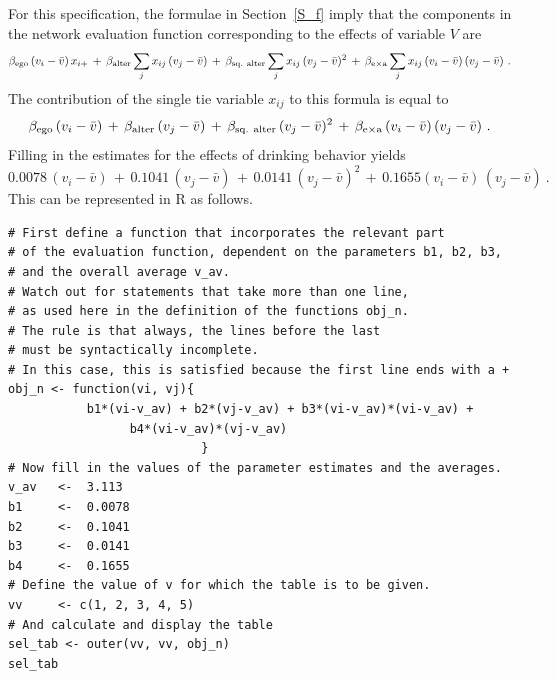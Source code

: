 \documentclass[a4paper,fleqn,11pt]{article}
\newcommand{\+}{\, + \,}
\newcommand{\R}{{\sf R }}
\begin{document}
For this specification, the formulae in Section~\ref{S_f} imply that the
components in the network evaluation function corresponding to the effects
of variable $V$ are
\begin{equation}
 \beta_{\rm ego}\, (v_i - \bar v) \, x_{i+}
           \, + \, \beta_{\rm alter}  \sum_j x_{ij}\, (v_j - \bar v)
 \, + \, \beta_{\rm sq.\ alter}  \sum_j x_{ij}\, (v_j - \bar v)^2  \, + \,
   \beta_{\rm e \times a}  \sum_j x_{ij}\,(v_i - \bar v) \,(v_j - \bar v)  \ .
        \label{eq_contr2_V}
\end{equation}
The contribution of the single tie variable $x_{ij}$ to this formula
is equal to
\begin{equation}
  \beta_{\rm ego}\, (v_i - \bar v)
         \, + \, \beta_{\rm alter}\,  (v_j - \bar v) \, + \,
      \beta_{\rm sq.\ alter}  \, (v_j - \bar v)^2  \,+\,
        \beta_{\rm e \times a} \, (v_i - \bar v)\, (v_j - \bar v) \ .
                 \label{eq_sel2}
\end{equation}
Filling in the estimates for the effects of drinking behavior yields
\[
  0.0078 \, (v_i - \bar v)  \, + \,  0.1041 \, (v_j - \bar v) \, + \,
      0.0141 \, (v_j - \bar v)^2
           \,+\,  0.1655   (v_i - \bar v)\, (v_j - \bar v) \ .
\]
This can be represented in \R as follows.
\begin{footnotesize}
\begin{verbatim}
# First define a function that incorporates the relevant part
# of the evaluation function, dependent on the parameters b1, b2, b3,
# and the overall average v_av.
# Watch out for statements that take more than one line,
# as used here in the definition of the functions obj_n.
# The rule is that always, the lines before the last
# must be syntactically incomplete.
# In this case, this is satisfied because the first line ends with a +
obj_n <- function(vi, vj){
           b1*(vi-v_av) + b2*(vj-v_av) + b3*(vi-v_av)*(vi-v_av) +
                 b4*(vi-v_av)*(vj-v_av)
                           }
# Now fill in the values of the parameter estimates and the averages.
v_av   <-  3.113
b1     <-  0.0078
b2     <-  0.1041
b3     <-  0.0141
b4     <-  0.1655
# Define the value of v for which the table is to be given.
vv     <- c(1, 2, 3, 4, 5)
# And calculate and display the table
sel_tab <- outer(vv, vv, obj_n)
sel_tab
\end{verbatim}
\end{footnotesize}
\end{document}

